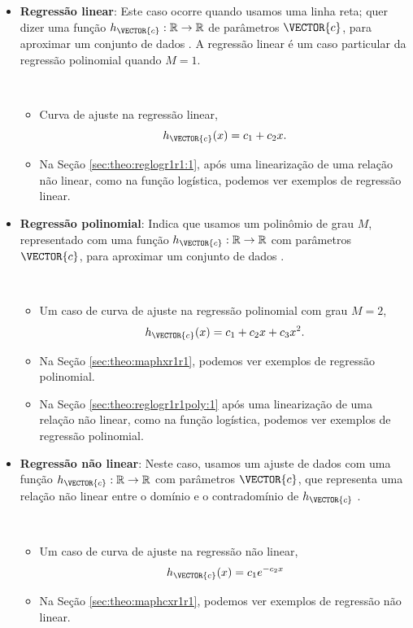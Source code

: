 \begin{itemize}
\item \textbf{Regressão linear}: 
Este caso ocorre quando usamos uma linha reta;
quer dizer uma função $h_{\VECTOR{c}}:\mathbb{R} \rightarrow \mathbb{R}$ de parâmetros $\VECTOR{c}$, 
para aproximar um conjunto de dados \cite[pp. 398, 402]{chapra2016metodos} \cite[pp. 25]{aster2013parameter}.
A regressão linear é um caso particular da regressão polinomial quando $M=1$.
\begin{example}~
\begin{itemize}
\item Curva de ajuste na regressão linear, 
\begin{equation}
h_{\VECTOR{c}}(x)=c_1+c_2 x.
\end{equation}
\item Na Seção \ref{sec:theo:reglogr1r1:1}, após uma linearização de uma relação não linear,
como na função logística, podemos ver exemplos de regressão linear.
\end{itemize}
\end{example}

\item \textbf{Regressão polinomial}: 
Indica que usamos um polinômio de grau $M$,
representado com uma função $h_{\VECTOR{c}}:\mathbb{R} \rightarrow \mathbb{R}$ com parâmetros $\VECTOR{c}$, 
 para aproximar um conjunto de dados \cite[pp. 399, 415]{chapra2016metodos}.
\begin{example}~
\begin{itemize}
\item Um caso de curva de ajuste na regressão polinomial com grau $M=2$,
\begin{equation}
h_{\VECTOR{c}}(x)=c_1+c_2 x+c_3 x^2.
\end{equation}
\item Na Seção \ref{sec:theo:maphxr1r1}, podemos ver exemplos de regressão polinomial.
\item Na Seção \ref{sec:theo:reglogr1r1poly:1} após uma linearização de uma relação não linear,
como na função logística, podemos ver exemplos de regressão polinomial.
\end{itemize}
\end{example}

\item \textbf{Regressão não linear}: 
Neste caso, usamos um ajuste de dados
com uma função $h_{\VECTOR{c}}:\mathbb{R} \rightarrow \mathbb{R}$ com parâmetros $\VECTOR{c}$, 
que representa uma relação não linear entre o domínio e o contradomínio de $h_{\VECTOR{c}}$ 
\cite[pp. 424]{chapra2016metodos} \cite[pp. 217]{agarwal2014creators}.
\begin{example}~
\begin{itemize}
\item Um caso de curva de ajuste na regressão não linear, 
\begin{equation}
h_{\VECTOR{c}}(x)=c_1 e^{-c_2 x}
\end{equation}
\item Na Seção \ref{sec:theo:maphcxr1r1}, podemos ver exemplos de regressão não linear.
\end{itemize}
\end{example}


\end{itemize}
